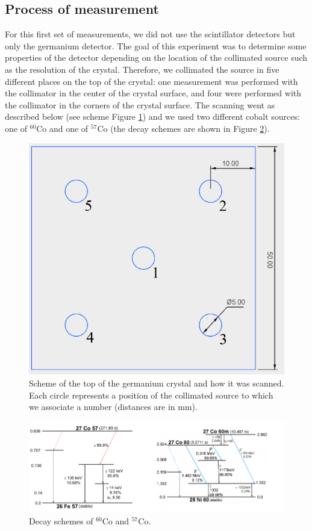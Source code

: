 \documentclass[11pt,a4paper]{article}
\begin{document}
\subsection{Process of measurement}

For this first set of measurements, we did not use the scintillator detectors but only the germanium detector. The goal of this experiment was to determine some properties of the detector depending on the location of the collimated source such as the resolution of the crystal. Therefore, we collimated the source in five different places on the top of the crystal: one measurement was performed with the collimator in the center of the crystal surface, and four were performed with the collimator in the corners of the crystal surface. The scanning went as described below (see scheme Figure \ref{scan}) and we used two different cobalt sources: one of $^{60}$Co and one of $^{57}$Co (the decay schemes are shown in Figure \ref{decayCos}).

\begin{figure}[!h]
\centering
\includegraphics[scale=0.6]{scan.png}
\caption{Scheme of the top of the germanium crystal and how it was scanned. Each circle represents a position of the collimated source to which we associate a number (distances are in mm).}
\label{scan}
\end{figure}

\begin{figure}[!h]
\centering
\includegraphics[scale=0.9]{Cos_decays.png}
\caption{Decay schemes of $^{60}$Co and $^{57}$Co.}
\label{decayCos}
\end{figure}
\end{document}
